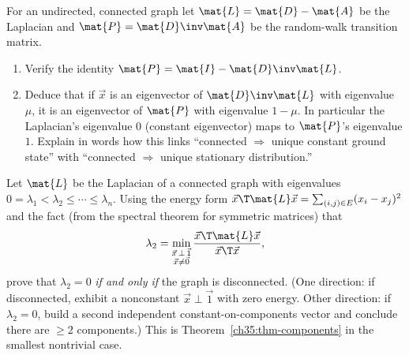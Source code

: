 \begin{exercise}
\label{ch35:ex-bridge}
For an undirected, connected graph let $\mat{L} = \mat{D}-\mat{A}$ be the Laplacian and
$\mat{P} = \mat{D}\inv\mat{A}$ be the random-walk transition matrix.
\begin{enumerate}
\item Verify the identity $\mat{P} = \mat{I} - \mat{D}\inv\mat{L}$.
\item Deduce that if $\vec{x}$ is an eigenvector of $\mat{D}\inv\mat{L}$ with eigenvalue
$\mu$, it is an eigenvector of $\mat{P}$ with eigenvalue $1-\mu$. In particular the
Laplacian's eigenvalue $0$ (constant eigenvector) maps to $\mat{P}$'s eigenvalue $1$. Explain
in words how this links ``connected $\Rightarrow$ unique constant ground state'' with
``connected $\Rightarrow$ unique stationary distribution.''
\end{enumerate}
\end{exercise}

\begin{exercise}
\label{ch35:ex-fiedler}
Let $\mat{L}$ be the Laplacian of a connected graph with eigenvalues
$0 = \lambda_1 < \lambda_2 \le \cdots \le \lambda_n$. Using the energy form
$\vec{x}\T\mat{L}\vec{x} = \sum_{(i,j)\in E}(x_i-x_j)^2$ and the fact (from the spectral
theorem for symmetric matrices) that
\[
\lambda_2 = \min_{\substack{\vec{x}\,\perp\,\vec{1}\\ \vec{x}\ne\vec0}}
\frac{\vec{x}\T\mat{L}\vec{x}}{\vec{x}\T\vec{x}},
\]
prove that $\lambda_2 = 0$ \emph{if and only if} the graph is disconnected. (One direction:
if disconnected, exhibit a nonconstant $\vec{x}\perp\vec1$ with zero energy. Other direction:
if $\lambda_2 = 0$, build a second independent constant-on-components vector and conclude
there are $\ge 2$ components.) This is Theorem~\ref{ch35:thm-components} in the
smallest nontrivial case.
\end{exercise}
